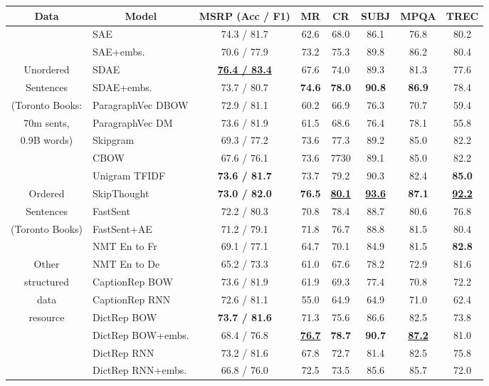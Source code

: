 \begin{table*}[ht]
\small
\newcommand{\mc}[1]{\multicolumn{1}{l|}{#1}}
  \begin{center}

      {
        \begin{tabular}{c|l|cccccc}
           \multicolumn{1}{c}{Data} & \multicolumn{1}{|c|}{Model} & MSRP (Acc / F1) & MR & CR & SUBJ & MPQA & TREC 
          \\
          \hline
          \hline
          & SAE & 74.3 / 81.7	& 62.6	& 68.0	& 86.1	& 76.8	& 80.2 \\
          & SAE+embs. & 70.6 / 77.9	& 73.2	& 75.3	& 89.8	& 86.2	& 80.4 \\
          Unordered  & SDAE & \bf \underline{76.4 / 83.4}	& 67.6	& 74.0	& 89.3	& 81.3	& 77.6 \\
         Sentences & SDAE+embs. & 73.7 / 80.7	& \bf 74.6	&  \bf 78.0	& \bf 90.8	& \bf 86.9	& 78.4 \\
          (Toronto Books: &ParagraphVec DBOW & 72.9	/ 81.1	& 60.2	& 66.9	& 76.3	& 70.7	& 59.4 \\
        70m sents, & ParagraphVec DM & 73.6 / 81.9	& 61.5	& 68.6	& 76.4	& 78.1 & 55.8\\
         0.9B words) &Skipgram & 69.3 / 77.2	& 73.6	& 77.3	& 89.2	& 85.0	& 82.2 \\
         &CBOW & 67.6 / 76.1	& 73.6	& 7730 & 89.1	& 85.0 & 82.2 \\
           &Unigram TFIDF & \bf 73.6 /  81.7	& 73.7	& 79.2	& 90.3	& 82.4	& \bf 85.0 \\
          \hline 
             Ordered    & SkipThought & \bf 73.0 / 82.0 & \bf 76.5 & \bf  \underline{80.1}	& \bf \underline{93.6}	& \bf 87.1	& \bf \underline{92.2} \\
       Sentences &FastSent & 72.2 / 80.3	& 70.8	& 78.4	& 88.7	&80.6 & 76.8 \\
         (Toronto Books) &FastSent+AE & 71.2 / 79.1	& 71.8	& 76.7	& 88.8	& 81.5	& 80.4  \\
          \hline 
          &NMT En to Fr & 69.1 / 77.1	& 64.7	& 70.1	& 84.9	& 81.5	& \bf 82.8 \\
        Other  &NMT En to De & 65.2 / 73.3 & 61.0 & 67.6	& 78.2	& 72.9 & 81.6 \\
          structured & CaptionRep BOW & 73.6 / 81.9	& 61.9	& 69.3	& 77.4	& 70.8	& 72.2  \\
          data & CaptionRep RNN & 72.6 / 81.1 & 55.0 & 64.9 & 64.9 & 71.0 & 62.4 \\
           resource &DictRep BOW & \bf 73.7 / 81.6	& 71.3	& 75.6	& 86.6	& 82.5 & 73.8 \\
          &DictRep BOW+embs. & 68.4 / 76.8	&  \bf \underline{76.7}	& \bf 78.7	& \bf 90.7	& \bf \underline{87.2}	& 81.0  \\
           &DictRep RNN & 73.2	/ 81.6	& 67.8	& 72.7	& 81.4	& 82.5	& 75.8 \\
           &DictRep RNN+embs. & 66.8	 / 76.0 & 72.5	& 73.5	& 85.6	& 85.7 & 72.0 \\
          \hline   


\end{tabular}}
\end{center}
\end{table*}
